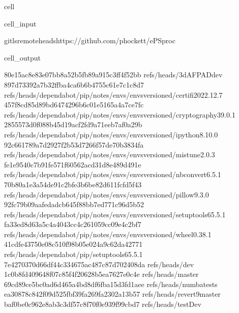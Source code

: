\documentclass[letterpaper,table,10pt,english]{jupyterBook}
\begin{document}
\begin{sphinxuseclass}{cell}\begin{sphinxVerbatimInput}

\begin{sphinxuseclass}{cell_input}
\begin{sphinxVerbatim}[commandchars=\\\{\}]
gitls\PYGZhy{}remote\PYGZhy{}\PYGZhy{}headshttps://github.com/phockett/ePSproc
\end{sphinxVerbatim}

\end{sphinxuseclass}\end{sphinxVerbatimInput}
\begin{sphinxVerbatimOutput}

\begin{sphinxuseclass}{cell_output}
\begin{sphinxVerbatim}[commandchars=\\\{\}]
80e15ac8e83e07bb8a52b5fb89a915c3ff4f52bb	refs/heads/3d\PYGZhy{}AFPAD\PYGZhy{}dev
897d73392a7b32ffba4ca6b6b4755c61e7c1c8d7	refs/heads/dependabot/pip/notes/envs/envs\PYGZhy{}versioned/certifi\PYGZhy{}2022.12.7
457f8cd85d89bd6474296b6c01e5165a4a7ce7fc	refs/heads/dependabot/pip/notes/envs/envs\PYGZhy{}versioned/cryptography\PYGZhy{}39.0.1
2855573d0f088b45d19acf2fd9a71eeb7af0a29b	refs/heads/dependabot/pip/notes/envs/envs\PYGZhy{}versioned/ipython\PYGZhy{}8.10.0
92c661789a7d2927f2b53d7266f57de70b3834fa	refs/heads/dependabot/pip/notes/envs/envs\PYGZhy{}versioned/mistune\PYGZhy{}2.0.3
fe1e9540c7b91fe571f60562acd31d8e489d491e	refs/heads/dependabot/pip/notes/envs/envs\PYGZhy{}versioned/nbconvert\PYGZhy{}6.5.1
70b80a1e3a54de91c2bfe3b6be82d611fcfd5f43	refs/heads/dependabot/pip/notes/envs/envs\PYGZhy{}versioned/pillow\PYGZhy{}9.3.0
92fc79b09aafedadcb645f88bb7ed771c96d5b52	refs/heads/dependabot/pip/notes/envs/envs\PYGZhy{}versioned/setuptools\PYGZhy{}65.5.1
fa33ed8d63a5c4a4043cc4c261059cc09e4c2bf7	refs/heads/dependabot/pip/notes/envs/envs\PYGZhy{}versioned/wheel\PYGZhy{}0.38.1
41cdfe43750e08c510f98b05e024a9c62da42771	refs/heads/dependabot/pip/setuptools\PYGZhy{}65.5.1
7e4270370d66df44c334675ac487c87d702408da	refs/heads/dev
1c0b8fd409648f07c85f4f20628b5ea7627e0c4e	refs/heads/master
69cd89ce5bc0ad6d465a4bd8df6fba15d3fd1aee	refs/heads/numba\PYGZhy{}tests
ea30878c842f09d525fbf39fa269fa2302a13b57	refs/heads/revert\PYGZhy{}9\PYGZhy{}master
baf0be0c962e8ab3c3df57c8f70f0e939f99cbd7	refs/heads/testDev
\end{sphinxVerbatim}

\end{sphinxuseclass}\end{sphinxVerbatimOutput}

\end{sphinxuseclass}
\end{document}
